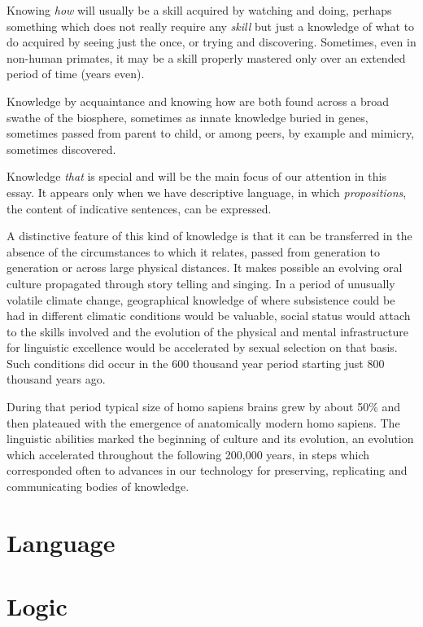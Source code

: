 \documentclass[10pt,titlepage]{book}
\begin{document}
Knowing \emph{how} will usually be a skill acquired by watching and doing, perhaps something which does not really require any \emph{skill} but just a knowledge of what to do acquired by seeing just the once, or trying and discovering.
Sometimes, even in non-human primates, it may be a skill properly mastered only over an extended period of time (years even).

Knowledge by acquaintance and knowing how are both found across a broad swathe of the biosphere, sometimes as innate knowledge buried in genes, sometimes passed from parent to child, or among peers, by example and mimicry, sometimes discovered.

Knowledge \emph{that} is special and will be the main focus of our attention in this essay.
It appears only when we have descriptive language, in which \emph{propositions}, the content of indicative sentences, can be expressed.

A distinctive feature of this kind of knowledge is that it can be transferred in the absence of the circumstances to which it relates, passed from generation to generation or across large physical distances.
It makes possible an evolving oral culture propagated through story telling and singing.
In a period of unusually volatile climate change, geographical knowledge of where subsistence could be had in different climatic conditions would be valuable, social status would attach to the skills involved and the evolution of the physical and mental infrastructure for linguistic excellence would be accelerated by sexual selection on that basis.
Such conditions did occur in the 600 thousand year period starting just 800 thousand years ago.

During that period typical size of homo sapiens brains grew by about 50\% and then plateaued with the emergence of anatomically modern homo sapiens.
The linguistic abilities marked the beginning of culture and its evolution, an evolution which accelerated throughout the following 200,000 years, in steps which corresponded often to advances in our technology for preserving, replicating and communicating bodies of knowledge.


\section{Language}

\section{Logic}
\end{document}
